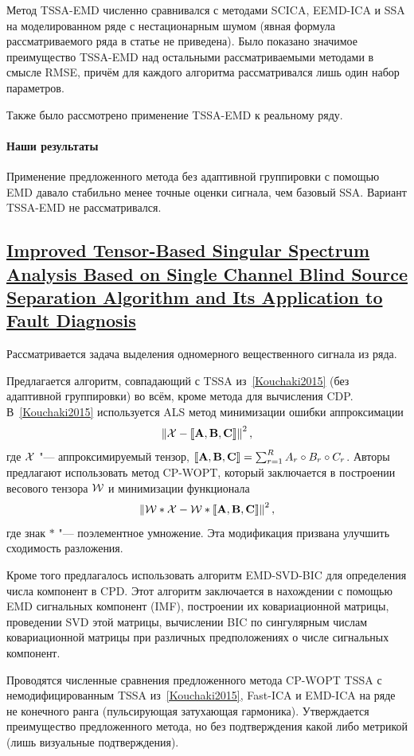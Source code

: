 \documentclass[12pt]{article}
\theoremstyle{plain}
\theoremstyle{definition}
\theoremstyle{remark}
\begin{document}
Метод TSSA-EMD численно сравнивался с методами SCICA,
EEMD-ICA и SSA на моделированном ряде с нестационарным шумом (явная
формула рассматриваемого ряда в статье не приведена).
Было показано значимое преимущество TSSA-EMD над остальными
рассматриваемыми методами в смысле RMSE, причём для каждого алгоритма
рассматривался лишь один набор параметров.

Также было рассмотрено применение TSSA-EMD к реальному ряду.

\paragraph{Наши результаты}
Применение предложенного метода без адаптивной группировки с
помощью EMD давало стабильно менее точные оценки сигнала, чем базовый SSA.
Вариант TSSA-EMD не рассматривался.

\subsection{\href{https://doi.org/10.3390/app7040418}{Improved
    Tensor-Based Singular Spectrum Analysis Based on Single Channel Blind
Source Separation Algorithm and Its Ap\-plication to Fault Diagnosis}}
\label{Yang2017}
Рассматривается задача выделения одномерного вещественного сигнала из ряда.

Предлагается алгоритм, совпадающий с TSSA из~\ref{Kouchaki2015} (без
адаптивной группировки) во всём, кроме метода для вычисления CDP.
В~\ref{Kouchaki2015} используется ALS метод минимизации ошибки аппроксимации
\[
  \left\|\mathcal{X} - \llbracket \mathbf{A}, \mathbf{B}, \mathbf{C}\rrbracket \right\|^2,
\]
где $\mathcal{X}$ "--- аппроксимируемый тензор,
$\llbracket \mathbf{A}, \mathbf{B}, \mathbf{C}\rrbracket = \sum_{r=1}^{R} A_r \circ B_r
\circ C_r$.
Авторы предлагают использовать метод CP-WOPT, который заключается в построении
весового тензора $\mathcal{W}$ и минимизации функционала
\[
  \left\|\mathcal{W} * \mathcal{X} - \mathcal{W} * \llbracket \mathbf{A}, \mathbf{B},
  \mathbf{C}\rrbracket \right\|^2,
\]
где знак $*$ "--- поэлементное умножение.
Эта модификация призвана улучшить сходимость разложения.

Кроме того предлагалось использовать алгоритм EMD-SVD-BIC для
определения числа компонент в CPD.
Этот алгоритм заключается в нахождении с помощью EMD сигнальных
компонент (IMF), построении их ковариационной матрицы, проведении SVD
этой матрицы, вычислении BIC по сингулярным числам ковариационной
матрицы при различных предположениях о числе сигнальных компонент.

Проводятся численные сравнения предложенного метода CP-WOPT TSSA с
немодифицированным TSSA из~\ref{Kouchaki2015}, Fast-ICA и EMD-ICA на
ряде не конечного ранга (пульсирующая затухающая гармоника).
Утверждается преимущество предложенного метода, но без подтверждения
какой либо метрикой (лишь визуальные подтверждения).
\end{document}
